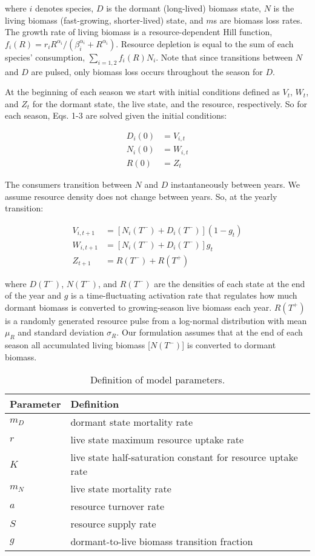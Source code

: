 \documentclass[12pt,]{article}
\begin{document}
where \(i\) denotes species, \(D\) is the dormant (long-lived) biomass
state, \(N\) is the living biomass (fast-growing, shorter-lived) state,
and \(m\)s are biomass loss rates. The growth rate of living biomass is
a resource-dependent Hill function,
\(f_{i}(R) = r_{i}R^{\alpha_{i}} / (\beta_{i}^{\alpha_{i}}+R^{\alpha_{i}})\).
Resource depletion is equal to the sum of each species' consumption,
\(\sum_{i=1,2}f_{i}(R)N_{i}\). Note that since transitions between \(N\)
and \(D\) are pulsed, only biomass loss occurs throughout the season for
\(D\).

At the beginning of each season we start with initial conditions defined
as \(V_{t}\), \(W_{t}\), and \(Z_{t}\) for the dormant state, the live
state, and the resource, respectively. So for each season, Eqs. 1-3 are
solved given the initial conditions:

\begin{align}
  D_{i}(0) &= V_{i,t} \\
  N_{i}(0) &= W_{i,t} \\
  R(0) &= Z_{t}
\end{align}

The consumers transition between \(N\) and \(D\) instantaneously between
years. We assume resource density does not change between years. So, at
the yearly transition:

\begin{align}
  V_{i,t+1} &= [N_{i}(T^-)+D_{i}(T^-)](1-g_{t}) \\
  W_{i,t+1} &= [N_{i}(T^-)+D_{i}(T^-)]g_{t} \\
  Z_{t+1} &= R(T^-) + R(T^+)
\end{align}

where \(D(T^-)\), \(N(T^-)\), and \(R(T^-)\) are the densities of each
state at the end of the year and \(g\) is a time-fluctuating activation
rate that regulates how much dormant biomass is converted to
growing-season live biomass each year. \(R(T^+)\) is a randomly
generated resource pulse from a log-normal distribution with mean
\(\mu_{R}\) and standard deviation \(\sigma_{R}\). Our formulation
assumes that at the end of each season all accumulated living biomass
{[}\(N(T^-)\){]} is converted to dormant biomass.

\begin{center}
\begin{table}
\caption{Definition of model parameters.}
\begin{tabular}{l l}
\hline
Parameter & Definition \\
\hline
$m_{D}$ & dormant state mortality rate \\
$r$ & live state maximum resource uptake rate \\
$K$ & live state half-saturation constant for resource uptake rate \\
$m_{N}$ & live state mortality rate \\
$a$ & resource turnover rate \\
$S$ & resource supply rate \\
$g$ & dormant-to-live biomass transition fraction \\ 
\hline
\end{tabular}
\end{table}
\end{center}
\end{document}
